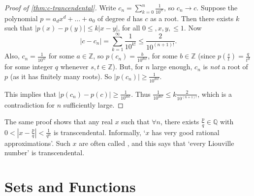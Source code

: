 \documentclass[a4paper]{scrartcl}
\begin{document}
\begin{center}

\end{center}

\begin{proof}[Proof of \autoref{thm:c-trancendental}]
	Write $c_n = \sum_{k = 0}^{n} \frac{1}{10^{k!}}$, so $c_n \rightarrow c$. Suppose the polynomial $p = a_d x^d + \dots + a_0$ of degree $d$ has $c$ as a root. 
	Then there exists $k$ such that $|p(x) - p(y)| \leq k|x - y|$, for all $0 \leq, x, y, \leq 1$. Now 
	$$|c - c_n| = \sum_{k = 1}^{\infty} \frac{1}{10^{k!}} \leq \frac{2}{10^{(n + 1)!}}.$$
Also, $c_n = \frac{1}{10^{n!}}$ for some $a \in \mathbb{Z}$, so $p(c_n) = \frac{b}{10^{dn!}}$, for some $b \in \mathbb{Z}$ (since $p(\frac{s}{t}) = \frac{q}{t^d}$ for some integer $q$ whenever $s, t \in \mathbb{Z}$).
But, for $n$ large enough, $c_n$ is \emph{not} a root of $p$ (as it has finitely many roots). So $|p(c_n)| \geq \frac{1}{10^{dn!}}$.

This implies that $|p(c_n) - p(c)| \geq \frac{1}{10^{dn!}}$. Thus $\frac{1}{10^{dn!}} \leq k \frac{2}{10^{(n + 1)!}}$, which is a contradiction for $n$ sufficiently large.
\end{proof}

\begin{remark}
	The same proof shows that any real $x$ such that $\forall n$, there exists $\frac{p}{q} \in \mathbb{Q}$ with $0 < |x - \frac{p}{q}| < \frac{1}{q^n}$ is transcendental. Informally, `$x$ has very good rational approximations'. Such $x$ are often called , and this says that `every Liouville number' is transcendental.
\end{remark}


\section{Sets and Functions}
\end{document}
